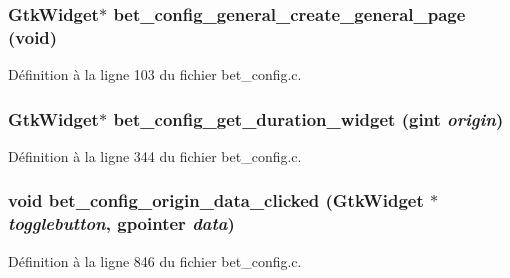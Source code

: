 \subsubsection[{bet\_\-config\_\-general\_\-create\_\-general\_\-page}]{\setlength{\rightskip}{0pt plus 5cm}GtkWidget$\ast$ bet\_\-config\_\-general\_\-create\_\-general\_\-page (void)}\label{bet__config_8h_a079506ce240edc48c94ff1ac64942696}


Définition à la ligne 103 du fichier bet\_\-config.c.

\subsubsection[{bet\_\-config\_\-get\_\-duration\_\-widget}]{\setlength{\rightskip}{0pt plus 5cm}GtkWidget$\ast$ bet\_\-config\_\-get\_\-duration\_\-widget (gint {\em origin})}\label{bet__config_8h_a9fcc68ddba810306496668a2ab91abf9}


Définition à la ligne 344 du fichier bet\_\-config.c.

\subsubsection[{bet\_\-config\_\-origin\_\-data\_\-clicked}]{\setlength{\rightskip}{0pt plus 5cm}void bet\_\-config\_\-origin\_\-data\_\-clicked (GtkWidget $\ast$ {\em togglebutton}, \/  gpointer {\em data})}\label{bet__config_8h_af35307117be15ea41c6a5eebcefdf975}


Définition à la ligne 846 du fichier bet\_\-config.c.

